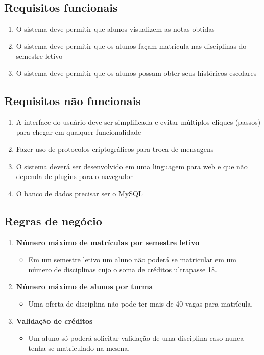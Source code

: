\documentclass[11pt]{../../classes/ifscarticle}
\begin{document}
\lipsum[2]


\subsection{Requisitos funcionais}
\label{sec:reqfuncionais}

\begin{enumerate}
    \item O sistema deve permitir que alunos visualizem as notas obtidas
    \item O sistema deve permitir que os alunos façam matrícula nas disciplinas do semestre letivo
    \item O sistema deve permitir que os alunos possam obter seus históricos escolares
\end{enumerate}

\subsection{Requisitos não funcionais}
\label{sec:reqnaofuncionais}

\begin{enumerate}
    \item A interface do usuário deve ser simplificada e evitar múltiplos cliques (passos) para chegar em qualquer funcionalidade
    \item Fazer uso de protocolos criptográficos para troca de mensagens
    \item O sistema deverá ser desenvolvido em uma linguagem para web e que não dependa de plugins para o navegador
    \item O banco de dados precisar ser o MySQL
\end{enumerate}

\subsection{Regras de negócio}
\label{sec:regrasdenegocio}

\begin{enumerate}
    \item \textbf{Número máximo de matrículas por semestre letivo}
    \begin{itemize}
        \item Em um semestre letivo um aluno não poderá se matricular em um número de disciplinas cujo o soma de créditos ultrapasse 18.
    \end{itemize}
    \item \textbf{Número máximo de alunos por turma}
    \begin{itemize}
        \item Uma oferta de disciplina não pode ter mais de 40 vagas para matrícula.
    \end{itemize}
    \item \textbf{Validação de créditos}
    \begin{itemize}
        \item Um aluno só poderá solicitar validação de uma disciplina caso nunca tenha se matriculado na mesma.
    \end{itemize}
\end{enumerate}
\end{document}
